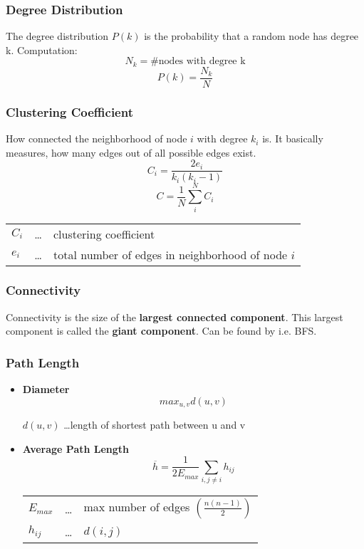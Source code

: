 \documentclass[parskip=full]{scrartcl}
\begin{document}
\subsubsection{Degree Distribution}
The degree distribution \textbf{$P(k)$} is the probability that a random node has degree k.\newline
Computation:
\[N_k = \text{\#nodes with degree k}\]
\[P(k) = \frac{N_k}{N}\]

\subsubsection{Clustering Coefficient}
How connected the neighborhood of node $i$ with degree $k_i$ is. It basically measures, how many edges out of all possible edges exist.
\[C_i = \frac{2e_i}{k_i\left(k_i-1\right)}\]
\[C = \frac{1}{N} \sum_{i}^{N} C_i\]
\begin{center}
\begin{tabular}{l c l}
	$C_i$ & \dots & clustering coefficient \\
	$e_i$ & \dots & total number of edges in neighborhood of node $i$
\end{tabular}
\end{center}

\subsubsection{Connectivity}
Connectivity is the size of the \textbf{largest connected component}.
This largest component is called the \textbf{giant component}.
Can be found by i.e. BFS.

\subsubsection{Path Length}
\begin{itemize}
	\item[] \textbf{Diameter}\newline
		\[max_{u,v}d(u,v)\]
		\begin{center}
			$d(u,v)$ \dots length of shortest path between u and v
		\end{center}
	\item[] \textbf{Average Path Length}\newline
		\[\overline{h} = \frac{1}{2E_{max}}\sum_{i,j \neq i} h_{ij}\]
		\begin{center}
		\begin{tabular}{l c l}
			$E_{max}$ & \dots & max number of edges $\left(\frac{n(n-1)}{2}\right)$ \\
			$h_{ij}$ & \dots & $d(i,j)$
		\end{tabular}
		\end{center}
\end{itemize}
\end{document}
